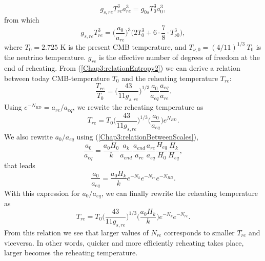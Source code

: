\documentclass[11pt,a4paper,twoside]{book}
\begin{document}
\begin{equation}
	\label{Chap3:relationEntropy}
	g_{s,re}T_{re}^{3}a_{re}^{3}=g_{0s}T_{0}^{3}a_{0}^{3},
\end{equation}
from which
\begin{equation}
	\label{Chap3:relationEntropy2}
	g_{s,re}T_{re}^{3} = \Bigg(\frac{a_{0}}{a_{re}}\Bigg)^{3}\big(2T_{0}^{3} + 6 \cdot \frac{7}{8} \cdot T_{\nu 0}^{3}\big),
\end{equation}
where $ T_{0}=2.725  $ K is the present CMB temperature, and $ T_{\nu,0}=(4/11)^{1/3}\ T_{0} $ is the neutrino temperature. $ g_{re} $ is the effective number of degrees of freedom at the end of reheating. From  (\ref{Chap3:relationEntropy2}) we can derive a relation between  today CMB-temperature $ T_{0} $ and the reheating temperature $ T_{re} $:
\begin{equation}
\label{Chap3:RelationReheatingToday}
\frac{T_{re}}{T_{0}}=\Bigg(\frac{43}{11g_{s,re}}\Bigg)^{1/3}\frac{a_{0}}{a_{eq}}\frac{a_{eq}}{a_{re}}.
\end{equation}
Using $ e^{-N_{RD}} = a_{re}/a_{eq}$, we rewrite the reheating temperature as
\begin{equation}
\label{Chap3:ReheatingTemperature}
T_{re} = T_{0}\Bigg(\frac{43}{11 g_{s,re}}\Bigg)^{1/3}\Bigg(\frac{a_{0}}{a_{eq}}\Bigg)e^{N_{RD}}.
\end{equation}
We also rewrite $ a_{0}/a_{eq} $ using (\ref{Chap3:relationBetweenScales}),
\begin{equation}
\label{Chap3:a0/aeq}
\frac{a_{0}}{a_{eq}}= \frac{a_{0}H_{0}}{k}\frac{a_{k}}{a_{end}}\frac{a_{end}}{a_{re}}\frac{a_{re}}{a_{eq}}\frac{H_{eq}}{H_{0}}\frac{H_{k}}{H_{eq}},
\end{equation}
that leads
\begin{equation}
\frac{a_{0}}{a_{eq}}= \frac{a_{0}H_{k}}{k}e^{-N_{k}}e^{-N_{re}}e^{-N_{RD}}.
\end{equation}
With this expression for $ a_{0}/a_{eq} $, we can finally rewrite the reheating temperature as
\begin{equation}
	\label{Chap3:reheatingTemperature3}
	T_{re} = T_{0}\Bigg(\frac{43}{11 g_{s,re}}\Bigg)^{1/3}\Bigg( \frac{a_{0}H_{k}}{k} \Bigg)e^{-N_{k}}e^{-N_{re}}.
\end{equation}
From this relation we see that larger values of $ N_{re} $ corresponds to smaller $ T_{re} $ and viceversa. In other words, quicker and more efficiently reheating takes place, larger becomes the reheating temperature. 
\end{document}
